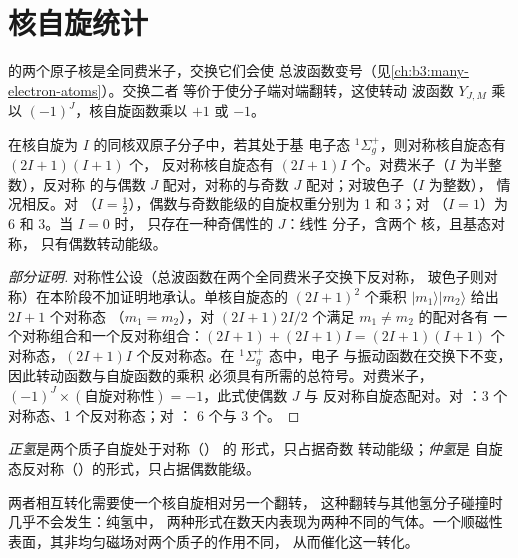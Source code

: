 \section{核自旋统计}

 的两个原子核是全同费米子，交换它们会使
总波函数变号（见\cref{ch:b3:many-electron-atoms}）。交换二者
等价于使分子端对端翻转，这使转动
波函数 $Y_{J,M}$ 乘以 $(-1)^J$，核自旋函数乘以 $+1$ 或 $-1$。

\begin{theorem}[核自旋统计]\label{thm:b3:statistical-thermo-applied:spin-statistics}
在核自旋为 $I$ 的同核双原子分子中，若其处于基
电子态 ${}^1\Sigma_g^+$，则对称核自旋态有 $(2I+1)(I+1)$ 个，
反对称核自旋态有 $(2I+1)I$ 个。对费米子（$I$ 为半整数），反对称
的与偶数 $J$ 配对，对称的与奇数 $J$ 配对；对玻色子（$I$ 为整数），
情况相反。对 （$I = \frac12$），偶数与奇数能级的自旋权重分别为
1 和 3；对 （$I = 1$）为 6 和 3。当 $I = 0$ 时，
只存在一种奇偶性的 $J$：线性  分子，含两个  核，且基态对称，
只有偶数转动能级。
\end{theorem}

\begin{proof}[部分证明]
对称性公设（总波函数在两个全同费米子交换下反对称，
玻色子则对称）在本阶段不加证明地承认。单核自旋态的
$(2I+1)^2$ 个乘积 $|m_1\rangle|m_2\rangle$ 给出 $2I+1$ 个对称态
（$m_1 = m_2$），对 $(2I+1)2I/2$ 个满足 $m_1 \ne m_2$ 的配对各有
一个对称组合和一个反对称组合：$(2I+1) + (2I+1)I = (2I+1)(I+1)$
个对称态，$(2I+1)I$ 个反对称态。在 ${}^1\Sigma_g^+$ 态中，电子
与振动函数在交换下不变，因此转动函数与自旋函数的乘积
必须具有所需的总符号。对费米子，
$(-1)^J \times(\text{自旋对称性}) = -1$，此式使偶数 $J$ 与
反对称自旋态配对。对 ：3 个对称态、1 个反对称态；对 ：
6 个与 3 个。
\end{proof}

\begin{definition}[正氢与仲氢]\label{def:b3:statistical-thermo-applied:spin-isomers}
\emph{正氢}是两个质子自旋处于对称（）
的  形式，只占据奇数
转动能级；\emph{仲氢}是
自旋态反对称（）的形式，只占据偶数能级。
\end{definition}

两者相互转化需要使一个核自旋相对另一个翻转，
这种翻转与其他氢分子碰撞时几乎不会发生：纯氢中，
两种形式在数天内表现为两种不同的气体。一个顺磁性
表面，其非均匀磁场对两个质子的作用不同，
从而催化这一转化。

